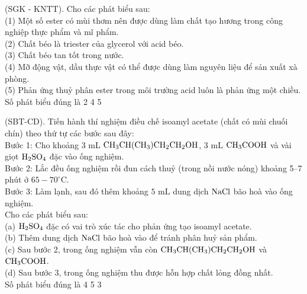 \documentclass[12pt,a4paper]{article}
\begin{document}
\begin{ex}
(SGK - KNTT). Cho các phát biểu sau:\\
(1) Một số ester có mùi thơm nên được dùng làm chất tạo hương trong công nghiệp thực phẩm và mĩ phẩm.\\
(2) Chất béo là triester của glycerol với acid béo.\\
(3) Chất béo tan tốt trong nước.\\
(4) Mỡ động vật, dầu thực vật có thể được dùng làm nguyên liệu để sản xuất xà phòng.\\
(5) Phản ứng thuỷ phân ester trong môi trường acid luôn là phản ứng một chiều.\\
Số phát biểu đúng là
\choice
{2}
{}
{4}
{5}
\end{ex}

\begin{ex}
(SBT-CD). Tiến hành thí nghiệm điều chế isoamyl acetate (chất có mùi chuối chín) theo thứ tự các bước sau đây:\\
Bước 1: Cho khoảng $3\text{ mL}$ $\ce{CH3CH(CH3)CH2CH2OH}$, $3\text{ mL}$ $\ce{CH3COOH}$ và vài giọt $\ce{H2SO4}$ đặc vào ống nghiệm.\\
Bước 2: Lắc đều ống nghiệm rồi đun cách thuỷ (trong nồi nước nóng) khoảng 5--7 phút ở $65-70^\circ\text{C}$.\\
Bước 3: Làm lạnh, sau đó thêm khoảng $5\text{ mL}$ dung dịch $\ce{NaCl}$ bão hoà vào ống nghiệm.\\
Cho các phát biểu sau:\\
(a) $\ce{H2SO4}$ đặc có vai trò xúc tác cho phản ứng tạo isoamyl acetate.\\
(b) Thêm dung dịch $\ce{NaCl}$ bão hoà vào để tránh phân huỷ sản phẩm.\\
(c) Sau bước 2, trong ống nghiệm vẫn còn $\ce{CH3CH(CH3)CH2CH2OH}$ và $\ce{CH3COOH}$.\\
(d) Sau bước 3, trong ống nghiệm thu được hỗn hợp chất lỏng đồng nhất.\\
Số phát biểu đúng là
\choice
{4}
{5}
{3}
{}
\end{ex}
\end{document}
